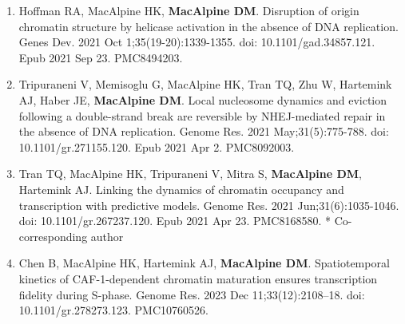 \begin{statement}
\begin{enumerate}

\item Hoffman RA, MacAlpine HK, \textbf{MacAlpine DM}. Disruption of origin chromatin structure by helicase activation in the absence of DNA replication. Genes Dev. 2021 Oct 1;35(19-20):1339-1355. doi: 10.1101/gad.34857.121. Epub 2021 Sep 23. PMC8494203.

\item Tripuraneni V, Memisoglu G, MacAlpine HK, Tran TQ, Zhu W, Hartemink AJ, Haber JE, \textbf{MacAlpine DM}. Local nucleosome dynamics and eviction following a double-strand break are reversible by NHEJ-mediated repair in the absence of DNA replication. Genome Res. 2021 May;31(5):775-788. doi: 10.1101/gr.271155.120. Epub 2021 Apr 2. PMC8092003.

\item Tran TQ, MacAlpine HK, Tripuraneni V, Mitra S, \textbf{MacAlpine DM}, Hartemink AJ. Linking the dynamics of chromatin occupancy and transcription with predictive models. Genome Res. 2021 Jun;31(6):1035-1046. doi: 10.1101/gr.267237.120. Epub 2021 Apr 23. PMC8168580. * Co-corresponding author


\item Chen B, MacAlpine HK, Hartemink AJ, \textbf{MacAlpine DM}. Spatiotemporal kinetics of CAF-1-dependent chromatin maturation ensures transcription fidelity during S-phase. Genome Res. 2023 Dec 11;33(12):2108–18. doi: 10.1101/gr.278273.123. PMC10760526.
\end{enumerate}

\end{statement}

